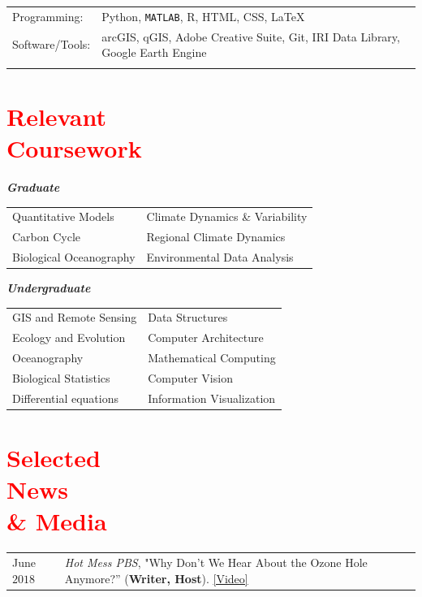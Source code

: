 \documentclass[margin, line]{res}
\begin{document}
\begin{resume}
\begin{tabular}{@{}p{1in}p{4in}}
Programming:& Python, \texttt{MATLAB}, R, HTML, CSS, \LaTeX \\
Software/Tools:&  arcGIS, qGIS, Adobe Creative Suite, Git, IRI Data Library, Google Earth Engine \\\\

\end{tabular}



\section{\sc \textcolor{Red}{\large{Relevant \\ Coursework}}}

\textit{\textbf{Graduate}}
\vspace*{0.05in}\\
\begin{tabular}{@{}p{2.5in}p{4in}}
Quantitative Models & Climate Dynamics \& Variability \\
Carbon Cycle & Regional Climate Dynamics\\
Biological Oceanography & Environmental Data Analysis \\
\end{tabular}

\textit{\textbf{Undergraduate}}
\vspace*{0.05in}\\
\begin{tabular}{@{}p{2.5in}p{4in}}
GIS and Remote Sensing & Data Structures \\
Ecology and Evolution & Computer Architecture \\
Oceanography & Mathematical Computing \\
Biological Statistics & Computer Vision \\
Differential equations & Information Visualization \\
\end{tabular}


\section{\sc \textcolor{Red}{\large{Selected  \\News \\ \& Media}}}
\vspace*{0.04in}
\begin{tabular}{@{}p{1in}p{4in}}
June $2018$ & \textit{Hot Mess PBS}, "Why Don’t We Hear About the Ozone Hole Anymore?'' (\textbf{Writer, Host}). \href{https://www.youtube.com/watch?v=mQpa_NYXUGI}{[Video]}\\


\end{tabular}
\end{resume}
\end{document}
